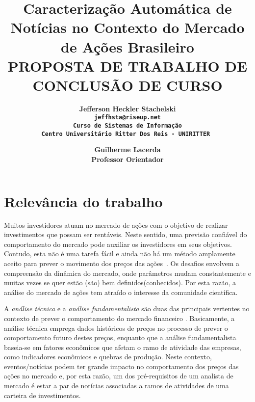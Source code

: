 \documentclass[11pt,a4paper]{article}
\begin{document}
\title{Caracterização Automática de Notícias no Contexto do Mercado de Ações Brasileiro \\ \smallskip
\small{ PROPOSTA DE TRABALHO DE CONCLUSÃO DE CURSO}}

\author{ \bf Jefferson Heckler Stachelski\\
    \tt jeffhsta@riseup.net \\
    Curso de Sistemas de Informação \\
    Centro Universitário Ritter Dos Reis - UNIRITTER
    \and
     \bf Guilherme Lacerda\\
    Professor Orientador\\
}

\maketitle
\thispagestyle{empty}


\section{Relevância do trabalho} \label{sec:intro}

Muitos investidores atuam no mercado de ações com o objetivo de realizar investimentos que possam ser rentáveis.
Neste sentido, uma previsão confiável do comportamento do mercado pode auxiliar os investidores em seus objetivos.
Contudo, esta não é uma tarefa fácil e ainda não há um método amplamente aceito para prever o movimento dos preços
das ações~\cite{Schumaker:2010}. Os desafios envolvem a compreensão da dinâmica do mercado, onde parâmetros mudam
constantemente e muitas vezes se quer estão (são) bem definidos(conhecidos). Por esta razão, a análise do mercado
de ações tem atraído o interesse da comunidade científica.

A \textit{análise técnica} e a \textit{análise fundamentalista} são duas das principais vertentes no contexto de
prever o comportamento do mercado financeiro \cite{Brum:acoes}. Basicamente, a análise técnica emprega dados históricos
de preços no processo de prever o comportamento futuro destes preços, enquanto que a análise fundamentalista baseia-se
em fatores econômicos que afetam o ramo de atividade das empresas, como indicadores econômicos e quebras de produção.
Neste contexto, eventos/notícias podem ter grande impacto no comportamento dos preços das ações no mercado e, por esta
razão, um dos pré-requisitos de um analista de mercado é estar a par de notícias associadas a ramos de atividades de
uma carteira de investimentos.
\end{document}
